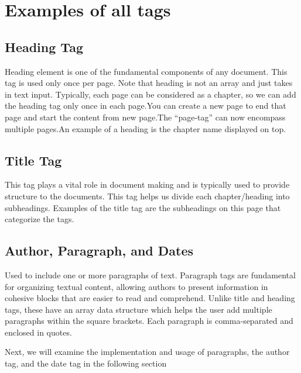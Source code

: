 \documentclass[oneside]{book}
\begin{document}
\newpage
\chapter{Examples of all tags}
\section{Heading Tag}
Heading element is one of the fundamental components of any document. This tag is used only once per page. Note that heading is not an array and just takes in text input.
            Typically, each page can be considered as a chapter, so we can add the heading tag only once in each page.You can create a new page to end that page and start the 
            content from new page.The ``page-tag'' can now encompass multiple pages.An example of a heading is the chapter name displayed on top.\par
\section{Title Tag}
This tag plays a vital role in document making and is typically used to provide structure to the documents. This tag helps us divide each chapter/heading into subheadings.
            Examples of the title tag are the subheadings on this page that categorize the tags.\par
\section{Author, Paragraph, and Dates}
Used to include one or more paragraphs of text. Paragraph tags are fundamental for organizing textual content, allowing authors to present
            information in cohesive blocks that are easier to read and comprehend. Unlike title and heading tags, these have an array data structure which helps the user add multiple 
            paragraphs within the square brackets. Each paragraph is comma-separated and enclosed in quotes.\par
Next, we will examine the implementation and usage of paragraphs, the author tag, and the date tag in the following section\par

\newpage
\end{document}
